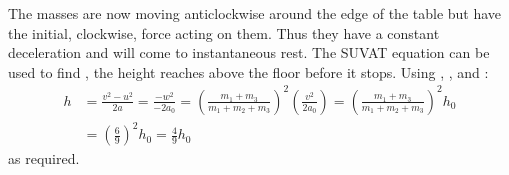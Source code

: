 \begin{problem}[A1969AMIIQ2a]
{The masses are now moving anticlockwise around the edge of the table but have the initial, clockwise, force acting on them. Thus they have a constant deceleration and will come to instantaneous rest. The SUVAT equation  can be used to find , the height  reaches above the floor before it stops. Using , ,  and :
		\begin{eqnarray*}
 			h &= \frac{v^{2} - u^{2}}{2a} = \frac{-w^{2}}{-2a_{0}} = \left( \frac{m_{1} + m_{3}}{m_{1} + m_{2} + m_{3}} \right)^{2} \left( \frac{v^{2}}{2a_{0}} \right) =  \left( \frac{m_{1} + m_{3}}{m_{1} + m_{2} + m_{3}} \right)^{2} h_{0} \\ 
 			&= \left( \frac{6}{9} \right)^{2} h_{0} = \frac{4}{9} h_{0}
 		\end{eqnarray*} 
 		as required.
}
\end{problem}